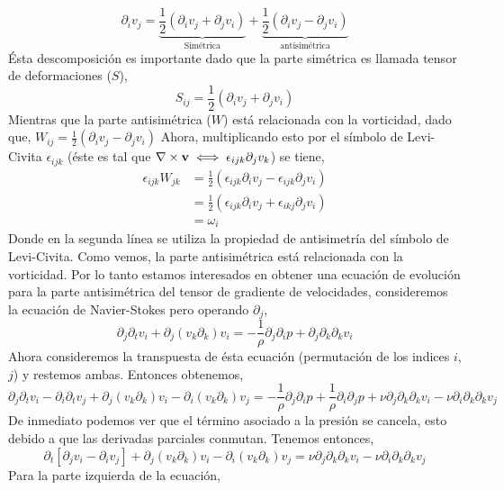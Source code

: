 \documentclass[executivepaper,12pt]{article}
\numberwithin{equation}{section}
\begin{document}
\begin{equation*}
	\partial_i v_j = \underbrace{\frac{1}{2}\left(\partial_iv_j +\partial_{j}v_i\right)}_{\text{Simétrica}} + \underbrace{\frac{1}{2}\left(\partial_iv_j -\partial_{j}v_i\right)}_{\text{antisimétrica}}
\end{equation*}
Ésta descomposición es importante dado que la parte simétrica es llamada tensor de deformaciones ($S$),
\begin{equation}
	S_{ij}=\frac{1}{2}\left(\partial_iv_j +\partial_{j}v_i\right) \label{eq.TenDef}
\end{equation}
Mientras que la parte antisimétrica ($W$) está relacionada con la vorticidad, dado que, 
$W_{ij}=\frac{1}{2}\left(\partial_iv_j -\partial_{j}v_i\right)$ 	
Ahora, multiplicando esto por el símbolo de Levi-Civita $\epsilon_{ijk}$ (éste es tal que $\vb{\nabla}\times\vb{v} \iff \epsilon_{ijk}\partial_jv_k$) se tiene,
\begin{align*}
	\epsilon_{ijk}W_{jk}&=\frac{1}{2}\left(\epsilon_{ijk}\partial_iv_j -\epsilon_{ijk}\partial_{j}v_i\right)\\
	&=\frac{1}{2}\left(\epsilon_{ijk}\partial_iv_j +\epsilon_{ikj}\partial_{j}v_i\right)\\
	&=\omega_i
\end{align*} 
Donde en la segunda línea se utiliza la propiedad de antisimetría del símbolo de Levi-Civita. Como vemos, la parte antisimétrica está relacionada con la vorticidad. Por lo tanto estamos interesados en obtener una ecuación de evolución para la parte antisimétrica del tensor de gradiente de velocidades, consideremos la ecuación de Navier-Stokes pero operando $\partial_j$,
\begin{equation*}
	\partial_j\partial_t v_i +\partial_j(v_k\partial_k)v_i=-\frac{1}{\rho}\partial_j\partial_i p + \partial_j\partial_k\partial_k v_i
\end{equation*}  
Ahora consideremos la transpuesta de ésta ecuación (permutación de los indices $i$,$j$) y restemos ambas. Entonces obtenemos,
\begin{equation*}
	\partial_j\partial_t v_i-\partial_i\partial_t v_j +\partial_j(v_k\partial_k)v_i-\partial_i(v_k\partial_k)v_j=-\frac{1}{\rho}\partial_j\partial_i p+\frac{1}{\rho}\partial_i\partial_j p + \nu\partial_j\partial_k\partial_k v_i-\nu\partial_i\partial_k\partial_k v_j
\end{equation*}
De inmediato podemos ver que el término asociado a la presión se cancela, esto debido a que las derivadas parciales conmutan. Tenemos entonces,
\begin{equation}
	\partial_t\left[\partial_j v_i-\partial_i v_j\right] +\partial_j(v_k\partial_k)v_i-\partial_i(v_k\partial_k)v_j=\nu\partial_j\partial_k\partial_k v_i-\nu\partial_i\partial_k\partial_k v_j \label{eq.Resta}
\end{equation}
Para la parte izquierda de la ecuación, 
\end{document}
